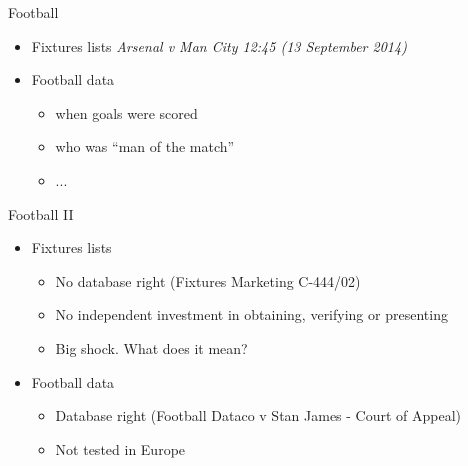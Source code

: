 \documentclass{beamer}
\begin{document}
\begin{frame}{Football}
  \begin{itemize}
  \item Fixtures lists {\it  Arsenal v Man City 12:45 (13 September 2014) }

\item Football data
  \begin{itemize}
  \item when goals were scored
  \item who was ``man of the match''
  \item ...
  \end{itemize}
  \end{itemize}
\end{frame}

\begin{frame}{Football II}
  \begin{itemize}
  \item Fixtures lists
    \begin{itemize}
    \item No database right (Fixtures Marketing C-444/02)
    \item No independent investment in obtaining, verifying or presenting
    \item Big shock. What does it mean?
    \end{itemize}
  \item Football data
    \begin{itemize}
    \item Database right (Football Dataco v Stan James - Court of Appeal)
    \item Not tested in Europe
    \end{itemize}
  \end{itemize}
  
\end{frame}
\end{document}

